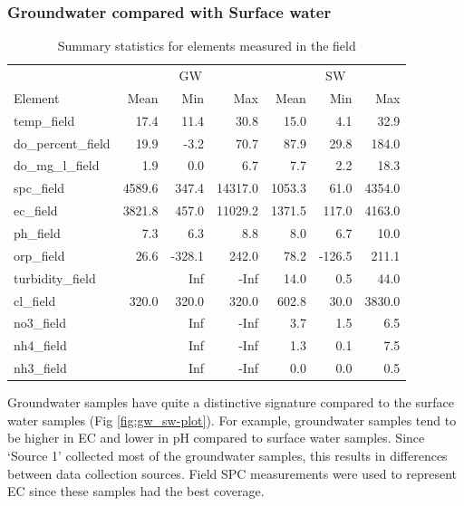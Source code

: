 \documentclass[, manuscript]{copernicus}
\begin{document}
\subsubsection{Groundwater compared with Surface water}

\clearpage
\begin{table}

\caption{\label{tab:TableElementstats}Summary statistics for elements measured in the field}
\centering
\begin{tabular}[t]{l|r|r|r|r|r|r}
\hline
\multicolumn{1}{c|}{} & \multicolumn{3}{c|}{GW} & \multicolumn{3}{c}{SW} \\
\cline{2-4} \cline{5-7}
Element & Mean & Min & Max & Mean & Min & Max\\
\hline
temp\_field & 17.4 & 11.4 & 30.8 & 15.0 & 4.1 & 32.9\\
\hline
do\_percent\_field & 19.9 & -3.2 & 70.7 & 87.9 & 29.8 & 184.0\\
\hline
do\_mg\_l\_field & 1.9 & 0.0 & 6.7 & 7.7 & 2.2 & 18.3\\
\hline
spc\_field & 4589.6 & 347.4 & 14317.0 & 1053.3 & 61.0 & 4354.0\\
\hline
ec\_field & 3821.8 & 457.0 & 11029.2 & 1371.5 & 117.0 & 4163.0\\
\hline
ph\_field & 7.3 & 6.3 & 8.8 & 8.0 & 6.7 & 10.0\\
\hline
orp\_field & 26.6 & -328.1 & 242.0 & 78.2 & -126.5 & 211.1\\
\hline
turbidity\_field &  & Inf & -Inf & 14.0 & 0.5 & 44.0\\
\hline
cl\_field & 320.0 & 320.0 & 320.0 & 602.8 & 30.0 & 3830.0\\
\hline
no3\_field &  & Inf & -Inf & 3.7 & 1.5 & 6.5\\
\hline
nh4\_field &  & Inf & -Inf & 1.3 & 0.1 & 7.5\\
\hline
nh3\_field &  & Inf & -Inf & 0.0 & 0.0 & 0.5\\
\hline
\end{tabular}
\end{table}

Groundwater samples have quite a distinctive signature compared to the
surface water samples (Fig \ref{fig:gw_sw-plot}). For example,
groundwater samples tend to be higher in EC and lower in pH compared to
surface water samples. Since `Source 1' collected most of the
groundwater samples, this results in differences between data collection
sources. Field SPC measurements were used to represent EC since these
samples had the best coverage.
\end{document}
